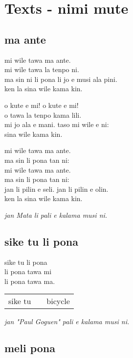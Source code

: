 \section{Texts - nimi mute}
\subsection{ma ante}

mi wile tawa ma ante. \\
mi wile tawa la tenpo ni.   \\
ma sin ni li pona li jo e musi ala pini. \\
ken la sina wile kama kin.

o kute e mi! o kute e mi!  \\
o tawa la tenpo kama lili.    \\
mi jo ala e mani. taso mi wile e ni: \\
sina wile kama kin.

mi wile tawa ma ante. \\
ma sin li pona tan ni: \\
mi wile tawa ma ante. \\
ma sin li pona tan ni: \\
jan li pilin e seli. jan li pilin e olin. \\
ken la sina wile kama kin.

\textit{jan Mata li pali e kalama musi ni. \cite{www:Mata:01,www:Mata:02}}
%
\subsection{sike tu li pona}

sike tu li pona  \\
li pona tawa mi  \\
li pona tawa ma.

\begin{supertabular}{p{5,5cm}|ll}
    sike tu &  & bicycle \\
\end{supertabular}

\textit{jan "Paul Goguen"  pali e kalama musi ni. \cite{www:PaulGoguen:01}}
%
\subsection{meli pona}

